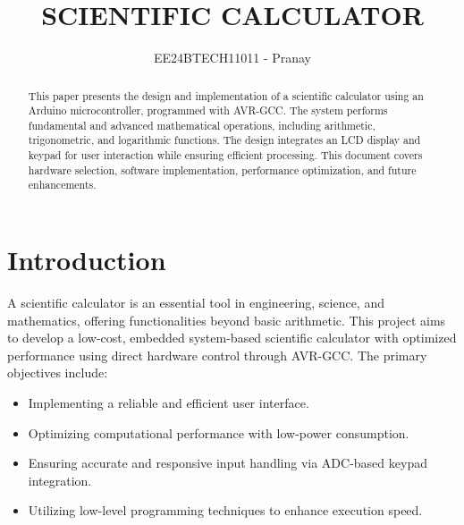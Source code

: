 \documentclass[journal]{IEEEtran}
\begin{document}

\vspace{3cm}

\title{SCIENTIFIC CALCULATOR}
\author{EE24BTECH11011 - Pranay}

{\let\newpage\relax\maketitle}

\renewcommand{\thefigure}{\theenumi}
\renewcommand{\thetable}{\theenumi}
\setlength{\intextsep}{10pt} %


\renewcommand{\thetable}{\theenumi}
\begin{abstract}
This paper presents the design and implementation of a scientific calculator using an Arduino microcontroller, programmed with AVR-GCC. The system performs fundamental and advanced mathematical operations, including arithmetic, trigonometric, and logarithmic functions. The design integrates an LCD display and keypad for user interaction while ensuring efficient processing. This document covers hardware selection, software implementation, performance optimization, and future enhancements.
\end{abstract}

\section{Introduction}
A scientific calculator is an essential tool in engineering, science, and mathematics, offering functionalities beyond basic arithmetic. This project aims to develop a low-cost, embedded system-based scientific calculator with optimized performance using direct hardware control through AVR-GCC. The primary objectives include:
\begin{itemize}
    \item Implementing a reliable and efficient user interface.
    \item Optimizing computational performance with low-power consumption.
    \item Ensuring accurate and responsive input handling via ADC-based keypad integration.
    \item Utilizing low-level programming techniques to enhance execution speed.
\end{itemize}
\end{document}
